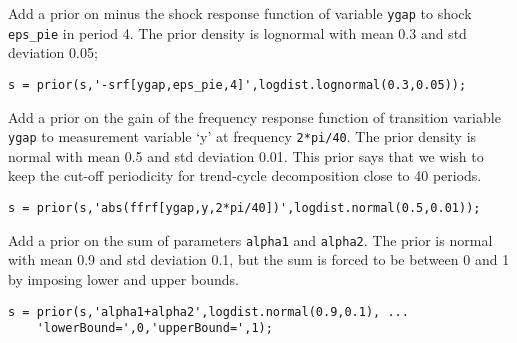 Add a prior on minus the shock response function of variable
\texttt{ygap} to shock \texttt{eps\_pie} in period 4. The prior density
is lognormal with mean 0.3 and std deviation 0.05;

\begin{verbatim}
s = prior(s,'-srf[ygap,eps_pie,4]',logdist.lognormal(0.3,0.05));
\end{verbatim}

Add a prior on the gain of the frequency response function of transition
variable \texttt{ygap} to measurement variable `y' at frequency
\texttt{2*pi/40}. The prior density is normal with mean 0.5 and std
deviation 0.01. This prior says that we wish to keep the cut-off
periodicity for trend-cycle decomposition close to 40 periods.

\begin{verbatim}
s = prior(s,'abs(ffrf[ygap,y,2*pi/40])',logdist.normal(0.5,0.01));
\end{verbatim}

Add a prior on the sum of parameters \texttt{alpha1} and
\texttt{alpha2}. The prior is normal with mean 0.9 and std deviation
0.1, but the sum is forced to be between 0 and 1 by imposing lower and
upper bounds.

\begin{verbatim}
s = prior(s,'alpha1+alpha2',logdist.normal(0.9,0.1), ...
    'lowerBound=',0,'upperBound=',1);
\end{verbatim}


